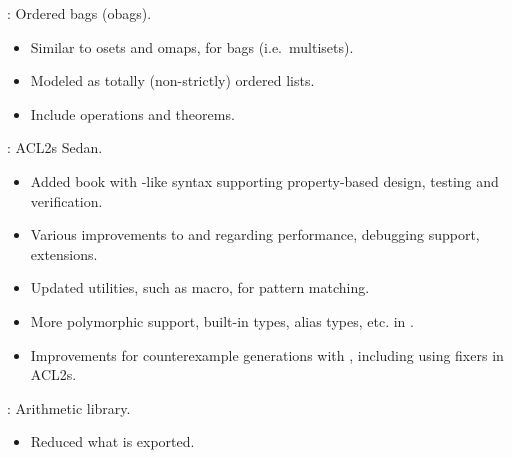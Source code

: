 
\begin{frame}

\newlibtitle

:
Ordered bags (obags).
\begin{itemize}
\item Similar to osets and omaps, for bags (i.e.\ multisets).
\item Modeled as totally (non-strictly) ordered lists.
\item Include operations and theorems.
\end{itemize}

\end{frame}


\begin{frame}

\implibtitle

: ACL2s Sedan.
\begin{itemize}
\item Added  book with -like syntax
  supporting property-based design, testing and verification.
\item Various improvements to  and 
  regarding performance, debugging support, extensions.
\item Updated utilities, such as  macro, for pattern matching.
\item More polymorphic support, built-in types, alias types, etc.
  in .
\item Improvements for counterexample generations with ,
  including using fixers in ACL2s.
\end{itemize}

\end{frame}


\begin{frame}

\implibtitle

:
Arithmetic library.
\begin{itemize}
\item Reduced what is exported.
\end{itemize}

\end{frame}

